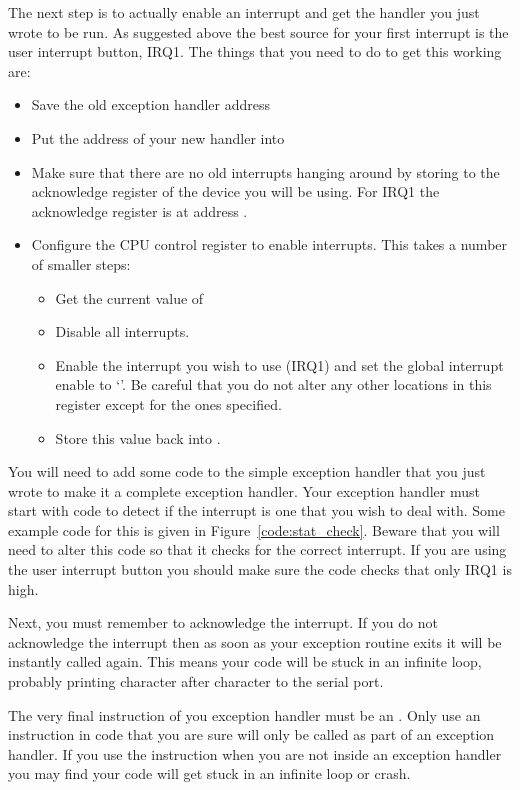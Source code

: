 The next step is to actually enable an interrupt and get the handler
you just wrote to be run. As suggested above the best source for your
first interrupt is the user interrupt button, IRQ1. The things that
you need to do to get this working are:

\begin{itemize}
\item Save the old exception handler address
\item Put the address of your new handler into 
\item Make sure that there are no old interrupts hanging around by
storing  to the acknowledge register of the device you
will be using. For IRQ1 the acknowledge register is at address
.
\item Configure the CPU control register to enable interrupts. This
takes a number of smaller steps:
\begin{itemize}
\item Get the current value of 
\item Disable all interrupts.
\item Enable the interrupt you wish to use (IRQ1) and set the global
interrupt enable to `'. Be careful that you do not alter any
other locations in this register except for the ones specified.
\item Store this value back into .
\end{itemize}
\end{itemize}


You will need to add some code to the simple exception handler that
you just wrote to make it a complete exception handler. Your exception
handler must start with code to detect if the interrupt is one that
you wish to deal with. Some example code for this is given in
Figure~\ref{code:stat_check}. Beware that you will need to alter this
code so that it checks for the correct interrupt. If you are using the
user interrupt button you should make sure the code checks that only
IRQ1 is high.

Next, you must remember to acknowledge the interrupt. If you do not
acknowledge the interrupt then as soon as your exception routine exits
it will be instantly called again. This means your code will be stuck
in an infinite loop, probably printing character after character to
the serial port.

The very final instruction of you exception handler must be an
. Only use an  instruction in code that you
are sure will only be called as part of an exception handler. If you
use the  instruction when you are not inside an exception
handler you may find your code will get stuck in an infinite loop or
crash.

